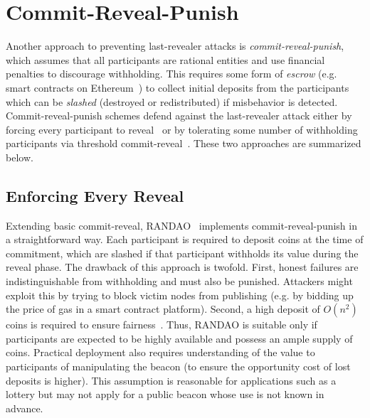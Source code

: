 
\section{Commit-Reveal-Punish}
\label{section:commit-reveal-punish}
Another approach to preventing last-revealer attacks is \textit{commit-reveal-punish}, which assumes that all participants are rational entities and use financial penalties to discourage withholding. This requires some form of \textit{escrow} (e.g. smart contracts on Ethereum~\cite{wood2014ethereum}) to collect initial deposits from the participants which can be \emph{slashed} (destroyed or redistributed) if misbehavior is detected. Commit-reveal-punish schemes defend against the last-revealer attack either by forcing every participant to reveal~\cite{youcai2017randao, andrychowicz2014secure, bentov2014use} or by tolerating some number of withholding participants via threshold commit-reveal~\cite{david2020economically}. These two approaches are summarized below.

\subsection{Enforcing Every Reveal}
Extending basic commit-reveal, RANDAO~\cite{youcai2017randao} implements commit-reveal-punish in a straightforward way. Each participant is required to deposit coins at the time of commitment, which are slashed if that participant withholds its value during the reveal phase.
The drawback of this approach is twofold. First, honest failures are indistinguishable from withholding and must also be punished. Attackers might exploit this by trying to block victim nodes from publishing (e.g. by bidding up the price of gas in a smart contract platform). Second, a high deposit of $O(n^2)$ coins is required to ensure fairness~\cite{andrychowicz2014secure,bentov2014use}. Thus, RANDAO is suitable only if participants are expected to be highly available and possess an ample supply of coins.
Practical deployment also requires understanding of the value to participants of manipulating the beacon (to ensure the opportunity cost of lost deposits is higher). This assumption is reasonable for applications such as a lottery but may not apply for a public beacon whose use is not known in advance.


